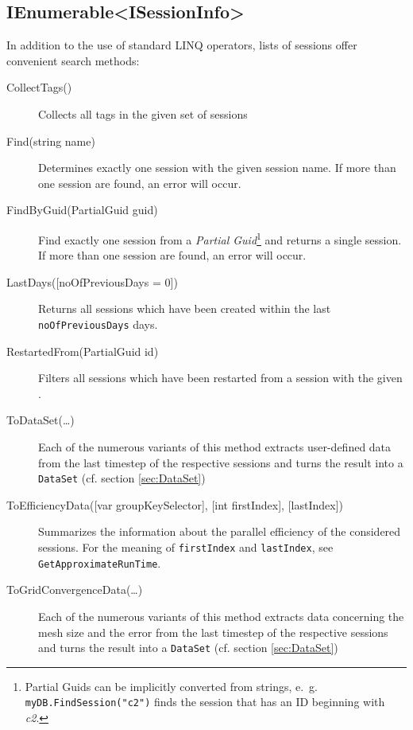 \subsection{IEnumerable<ISessionInfo>}
In addition to the use of standard LINQ operators, lists of sessions offer convenient search methods:
\begin{description}
	\item[CollectTags()]
	Collects all tags in the given set of sessions

	\item[Find(string name)]
	Determines exactly one session with the given session name. If more than one session are found, an error will occur.

	\item[FindByGuid(PartialGuid guid)]
	Find exactly one session from a \emph{Partial Guid}\footnote{Partial Guids can be implicitly converted from strings, e.~g. \lstinline{myDB.FindSession("c2")} finds the session that has an ID beginning with \emph{c2}.} and returns a single session. If more than one session are found, an error will occur.
	
	\item[LastDays({[}noOfPreviousDays = 0{]})]
	Returns all sessions which have been created within the last \lstinline{noOfPreviousDays} days.
	
	\item[RestartedFrom(PartialGuid id)]
	Filters all sessions which have been restarted from a session with the given .
	
	\item[ToDataSet(\ldots)]
	Each of the numerous variants of this method extracts user-defined data from the last timestep of the respective sessions and turns the result into a \lstinline{DataSet} (cf. section \ref{sec:DataSet})
	
	\item[ToEfficiencyData({[}var groupKeySelector{]}, {[}int firstIndex{]}, {[}lastIndex{]})]
	Summarizes the information about the parallel efficiency of the considered sessions. For the meaning of \lstinline{firstIndex} and \lstinline{lastIndex}, see \lstinline{GetApproximateRunTime}.
	
	\item[ToGridConvergenceData(\ldots)]
	Each of the numerous variants of this method extracts data concerning the mesh size and the error from the last timestep of the respective sessions and turns the result into a \lstinline{DataSet} (cf. section \ref{sec:DataSet})
	

\end{description}
